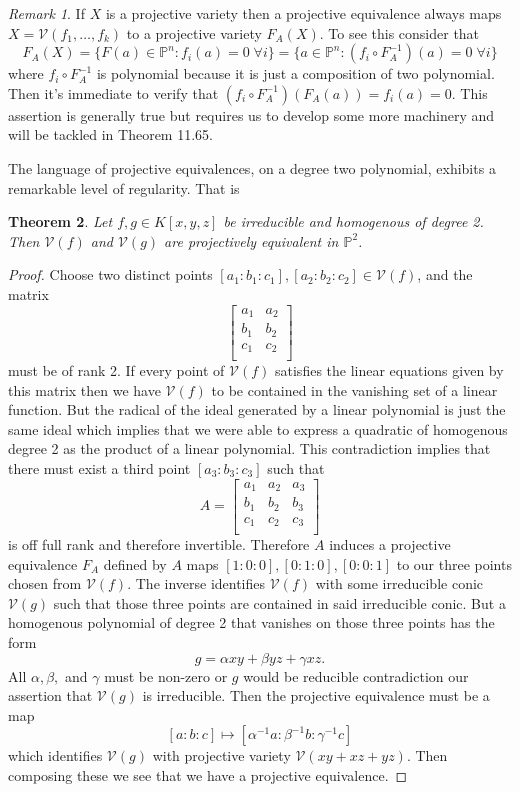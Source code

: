 \documentclass[40pt]{article}
\newtheorem{theorem}{Theorem}[section]
\newcommand{\Proj}{\mathbb{P}}
\newcommand{\V}{\mathcal{V}}
\theoremstyle{remark}
\newtheorem{remark}[theorem]{Remark}
\begin{document}
		\begin{remark}
			If $X$ is a projective variety then a projective equivalence always maps $X =\V(f_1,\dots,f_k)$ to a projective variety $F_A(X)$. To see this consider that 
			\[
			F_A(X) = \{F(a) \in \Proj^n : f_i(a) = 0 \; \forall i\} = \{a \in \Proj^n : (f_i \circ F^{-1}_A)(a) = 0 \; \forall i\}
			\]
			where $f_i \circ F_A^{-1}$ is polynomial because it is just a composition of two polynomial. Then it's immediate to verify that $(f_i \circ F_A^{-1})(F_A(a)) = f_i(a) = 0$. This assertion is generally true but requires us to develop some more machinery and will be tackled in Theorem 11.65. 
		\end{remark}
		The language of projective equivalences, on a degree two polynomial, exhibits a remarkable level of regularity. That is 
		\begin{theorem}
			Let $f,g \in K[x,y,z]$ be irreducible and homogenous of degree 2. Then $\V(f)$ and $\V(g)$ are projectively equivalent in $\Proj^2$.  
		\end{theorem}
		\begin{proof}
			Choose two distinct points $[a_1:b_1:c_1], [a_2:b_2:c_2] \in \V(f)$, and the matrix 
			\[
			\begin{bmatrix}
				a_1 & a_2 \\
				b_1 & b_2 \\
				c_1 & c_2 \\
			\end{bmatrix}
			\]
			must be of rank 2. If every point of $\V(f)$ satisfies the linear equations given by this matrix then we have $\V(f)$ to be contained in the vanishing set of a linear function. But the radical of the ideal generated by a linear polynomial is just the same ideal which implies that we were able to express a quadratic of homogenous degree 2 as the product of a linear polynomial. This contradiction implies that there must exist a third point $[a_3:b_3:c_3]$ such that 
			\[
			A = \begin{bmatrix}
				a_1 & a_2 & a_3\\
				b_1 & b_2 & b_3\\
				c_1 & c_2 & c_3\\
			\end{bmatrix}
			\]
			is off full rank and therefore invertible. Therefore $A$ induces a projective equivalence $F_A$ defined by $A$ maps $[1:0:0], [0:1:0], [0:0:1]$ to our three points chosen from $\V(f)$. The inverse identifies $\V(f)$ with some irreducible conic $\V(g)$ such that those three points are contained in said irreducible conic. But a homogenous polynomial of degree 2 that vanishes on those three points has the form
			\[
			g = \alpha xy + \beta yz + \gamma xz.
			\]
			All $\alpha, \beta,$ and $\gamma$ must be non-zero or $g$ would be reducible contradiction our assertion that $\V(g)$ is irreducible. Then the projective equivalence must be a map
			\[
			[a:b:c] \mapsto [\alpha^{-1}a : \beta^{-1} b : \gamma^{-1} c]
			\]
			which identifies $\V(g)$ with projective variety $\V(xy + xz+ yz)$. Then composing these we see that we have a projective equivalence. 
		\end{proof}
\end{document}

